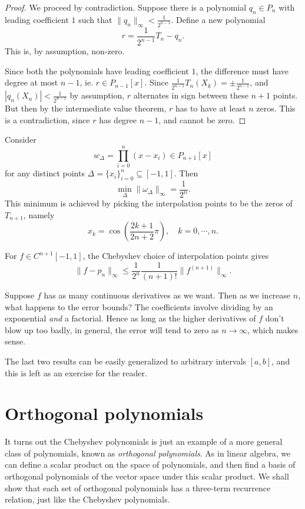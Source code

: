 \documentclass[a4paper]{article}
\begin{document}
\begin{proof}
  We proceed by contradiction. Suppose there is a polynomial $q_n \in P_n$ with leading coefficient $1$ such that $\|q_n\|_{\infty} < \frac{1}{2^{n - 1}}$. Define a new polynomial
  \[
    r = \frac{1}{2^{n - 1}}T_n - q_n.
  \]
  This is, by assumption, non-zero.

  Since both the polynomials have leading coefficient $1$, the difference must have degree at most $n - 1$, ie. $r \in P_{n - 1}[x]$. Since $\frac{1}{2^{n - 1}}T_n(X_k) = \pm \frac{1}{2^{n - 1}}$, and $|q_n(X_n)| < \frac{1}{2^{n - 1}}$ by assumption, $r$ alternates in sign between these $n + 1$ points. But then by the intermediate value theorem, $r$ has to have at least $n$ zeros. This is a contradiction, since $r$ has degree $n - 1$, and cannot be zero.
\end{proof}

\begin{cor}
  Consider
  \[
    w_\Delta = \prod_{i = 0}^n (x - x_i) \in P_{n + 1}[x]
  \]
  for any distinct points $\Delta = \{x_i\}_{i = 0}^n \subseteq [-1, 1]$. Then
  \[
    \min_{\Delta} \|\omega_{\Delta}\|_{\infty} = \frac{1}{2^n}.
  \]
  This minimum is achieved by picking the interpolation points to be the zeros of $T_{n + 1}$, namely
  \[
    x_k = \cos\left(\frac{2k + 1}{2n + 2} \pi\right), \quad k = 0, \cdots, n.
  \]
\end{cor}

\begin{thm}
  For $f \in C^{n + 1}[-1, 1]$, the Chebyshev choice of interpolation points gives
  \[
    \|f - p_n\|_{\infty} \leq \frac{1}{2^n} \frac{1}{(n + 1)!} \|f^{(n + 1)}\|_{\infty}.
  \]
\end{thm}
Suppose $f$ has as many continuous derivatives as we want. Then as we increase $n$, what happens to the error bounds? The coefficients involve dividing by an exponential \emph{and} a factorial. Hence as long as the higher derivatives of $f$ don't blow up too badly, in general, the error will tend to zero as $n \to \infty$, which makes sense.

The last two results can be easily generalized to arbitrary intervals $[a, b]$, and this is left as an exercise for the reader.

\section{Orthogonal polynomials}
It turns out the Chebyshev polynomials is just an example of a more general class of polynomials, known as \emph{orthogonal polynomials}. As in linear algebra, we can define a scalar product on the space of polynomials, and then find a basis of orthogonal polynomials of the vector space under this scalar product. We shall show that each set of orthogonal polynomials has a three-term recurrence relation, just like the Chebyshev polynomials.
\end{document}
